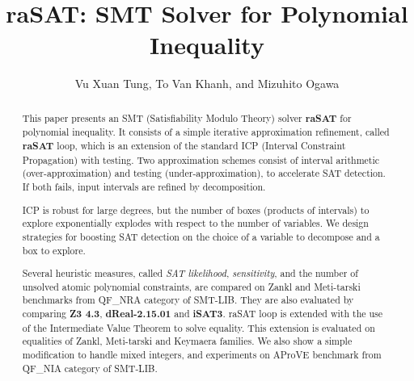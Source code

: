 \documentclass[runningheads,a4paper,oribibl]{llncs}
\begin{document}
%
\title{{\bf raSAT}: SMT Solver for Polynomial Inequality}

\author{Vu Xuan Tung, To Van Khanh, and Mizuhito Ogawa} 

\tableofcontents

\maketitle

\begin{abstract}
This paper presents an SMT (Satisfiability Modulo Theory) solver {\bf raSAT} for polynomial inequality. 
It consists of a simple iterative approximation refinement, called {\bf raSAT} loop, 
which is an extension of the standard ICP (Interval Constraint Propagation) with testing. 
Two approximation schemes consist of interval arithmetic (over-approximation) and 
testing (under-approximation), to accelerate SAT detection. 
If both fails, input intervals are refined by decomposition. 

ICP is robust for large degrees, but the number of boxes (products of intervals) to explore 
exponentially explodes with respect to the number of variables. 
We design strategies for boosting SAT detection on the choice of a variable to decompose
and a box to explore. 

Several heuristic measures, called {\em SAT likelihood}, {\em sensitivity}, and the number of 
unsolved atomic polynomial constraints, are compared on Zankl and Meti-tarski benchmarks from 
QF\_NRA category of SMT-LIB. They are also evaluated by comparing {\bf Z3 4.3}, \textbf{dReal-2.15.01} and {\bf iSAT3}. 
raSAT loop is extended with the use of the Intermediate Value Theorem to solve equality. This extension is evaluated on equalities of Zankl, Meti-tarski and Keymaera families.
We also show a simple modification to handle mixed integers, and experiments on 
AProVE benchmark from QF\_NIA category of SMT-LIB. 
\end{abstract}
\end{document}
